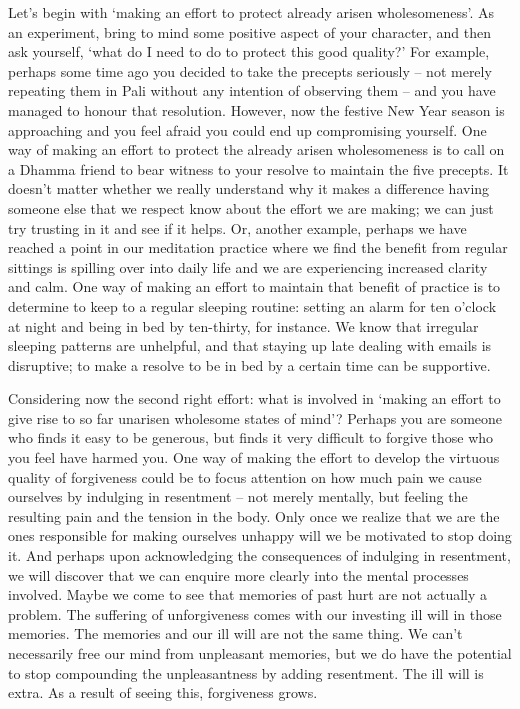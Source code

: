 Let's begin with `making an effort to protect already arisen
wholesomeness'. As an experiment, bring to mind some positive aspect of
your character, and then ask yourself, `what do I need to do to protect
this good quality?' For example, perhaps some time ago you decided to
take the precepts seriously -- not merely repeating them in Pali without
any intention of observing them -- and you have managed to honour that
resolution. However, now the festive New Year season is approaching and
you feel afraid you could end up compromising yourself. One way of
making an effort to protect the already arisen wholesomeness is to call
on a Dhamma friend to bear witness to your resolve to maintain the five
precepts. It doesn't matter whether we really understand why it makes a
difference having someone else that we respect know about the effort we
are making; we can just try trusting in it and see if it helps. Or,
another example, perhaps we have reached a point in our meditation
practice where we find the benefit from regular sittings is spilling
over into daily life and we are experiencing increased clarity and calm.
One way of making an effort to maintain that benefit of practice is to
determine to keep to a regular sleeping routine: setting an alarm for
ten o'clock at night and being in bed by ten-thirty, for instance. We
know that irregular sleeping patterns are unhelpful, and that staying up
late dealing with emails is disruptive; to make a resolve to be in bed
by a certain time can be supportive.

Considering now the second right effort: what is involved in `making an
effort to give rise to so far unarisen wholesome states of mind'?
Perhaps you are someone who finds it easy to be generous, but finds it
very difficult to forgive those who you feel have harmed you. One way of
making the effort to develop the virtuous quality of forgiveness could
be to focus attention on how much pain we cause ourselves by indulging
in resentment -- not merely mentally, but feeling the resulting pain and
the tension in the body. Only once we realize that we are the ones
responsible for making ourselves unhappy will we be motivated to stop
doing it. And perhaps upon acknowledging the consequences of indulging
in resentment, we will discover that we can enquire more clearly into
the mental processes involved. Maybe we come to see that memories of
past hurt are not actually a problem. The suffering of unforgiveness
comes with our investing ill will in those memories. The memories and
our ill will are not the same thing. We can't necessarily free our mind
from unpleasant memories, but we do have the potential to stop
compounding the unpleasantness by adding resentment. The ill will is
extra. As a result of seeing this, forgiveness grows.

